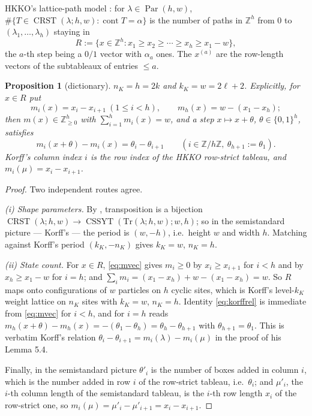 \documentclass[11pt]{article}
\newtheorem{proposition}[theorem]{Proposition}
\theoremstyle{definition}
\DeclareMathOperator{\Par}{Par}
\DeclareMathOperator{\CRST}{CRST}
\DeclareMathOperator{\CSSYT}{CSSYT}
\DeclareMathOperator{\cont}{cont}
\newcommand{\la}{\lambda}
\newcommand{\Z}{\mathbb{Z}}
\begin{document}
HKKO's lattice-path model \cite[Prop.~2.7]{HKKO}: for $\la\in\Par(h,w)$,
$\#\{T\in\CRST(\la;h,w):\cont T=\alpha\}$ is the number of paths in $\Z^{h}$
from $0$ to $(\la_1,\dots,\la_h)$ staying in
\[
  R:=\{x\in\Z^{h}: x_1\ge x_2\ge\cdots\ge x_h\ge x_1-w\},
\]
the $a$-th step being a $0/1$ vector with $\alpha_a$ ones. The $x^{(a)}$ are
the row-length vectors of the subtableaux of entries $\le a$.

\begin{proposition}[dictionary]\label{prop:dict}
$n_K=h=2k$ and $k_K=w=2\ell+2$. Explicitly, for $x\in R$ put
\begin{equation}\label{eq:mvec}
 m_i(x)=x_i-x_{i+1}\ (1\le i<h),\qquad m_h(x)=w-(x_1-x_h);
\end{equation}
then $m(x)\in\Z_{\ge0}^{h}$ with $\sum_{i=1}^{h}m_i(x)=w$, and a step
$x\mapsto x+\theta$, $\theta\in\{0,1\}^{h}$, satisfies
\begin{equation}\label{eq:korffrel}
 m_i(x+\theta)-m_i(x)=\theta_i-\theta_{i+1}\qquad(i\in\Z/h\Z,\ \theta_{h+1}:=\theta_1).
\end{equation}
Korff's column index $i$ is the row index of the HKKO row-strict tableau, and
$m_i(\mu)=x_i-x_{i+1}$.
\end{proposition}

\begin{proof}
Two independent routes agree.

\emph{(i) Shape parameters.} By \cite[Prop.~2.4]{HKKO}, transposition is a
bijection $\CRST(\la;h,w)\to\CSSYT(\mathrm{Tr}(\la;h,w);w,h)$; so in the
semistandard picture --- Korff's --- the period is $(w,-h)$, i.e.\ height $w$
and width $h$. Matching against Korff's period $(k_K,-n_K)$ gives $k_K=w$,
$n_K=h$.

\emph{(ii) State count.} For $x\in R$, \eqref{eq:mvec} gives $m_i\ge0$ by
$x_i\ge x_{i+1}$ for $i<h$ and by $x_h\ge x_1-w$ for $i=h$; and
$\sum_i m_i=(x_1-x_h)+w-(x_1-x_h)=w$. So $R$ maps onto configurations of $w$
particles on $h$ cyclic sites, which is Korff's level-$k_K$ weight lattice on
$n_K$ sites with $k_K=w$, $n_K=h$. Identity \eqref{eq:korffrel} is immediate
from \eqref{eq:mvec} for $i<h$, and for $i=h$ reads
$m_h(x+\theta)-m_h(x)=-(\theta_1-\theta_h)=\theta_h-\theta_{h+1}$ with
$\theta_{h+1}=\theta_1$. This is verbatim Korff's relation
$\theta_i-\theta_{i+1}=m_i(\la)-m_i(\mu)$ in the proof of his Lemma 5.4.

Finally, in the semistandard picture $\theta'_i$ is the number of boxes added in
column $i$, which is the number added in row $i$ of the row-strict tableau,
i.e.\ $\theta_i$; and $\mu'_i$, the $i$-th column length of the semistandard
tableau, is the $i$-th row length $x_i$ of the row-strict one, so
$m_i(\mu)=\mu'_i-\mu'_{i+1}=x_i-x_{i+1}$.
\end{proof}
\end{document}
